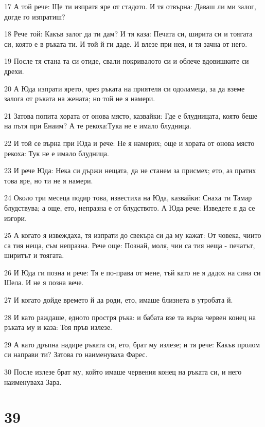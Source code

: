 \par 17 А той рече: Ще ти изпратя яре от стадото. И тя отвърна: Даваш ли ми залог, догде го изпратиш?
\par 18 Рече той: Какъв залог да ти дам? И тя каза: Печата си, ширита си и тоягата си, която е в ръката ти. И той й ги даде. И влезе при нея, и тя зачна от него.
\par 19 После тя стана та си отиде, свали покривалото си и облече вдовишките си дрехи.
\par 20 А Юда изпрати ярето, чрез ръката на приятеля си одоламеца, за да вземе залога от ръката на жената; но той не я намери.
\par 21 Затова попита хората от онова място, казвайки: Где е блудницата, която беше на пътя при Енаим? А те рекоха:Тука не е имало блудница.
\par 22 И той се върна при Юда и рече: Не я намерих; още и хората от онова място рекоха: Тук не е имало блудница.
\par 23 И рече Юда: Нека си държи нещата, да не станем за присмех; ето, аз пратих това яре, но ти не я намери.
\par 24 Около три месеца подир това, известиха на Юда, казвайки: Снаха ти Тамар блудствува; а още, ето, непразна е от блудството. А Юда рече: Изведете я да се изгори.
\par 25 А когато я извеждаха, тя изпрати до свекъра си да му кажат: От човека, чиито са тия неща, съм непразна. Рече още: Познай, моля, чии са тия неща - печатът, ширитът и тоягата.
\par 26 И Юда ги позна и рече: Тя е по-права от мене, тъй като не я дадох на сина си Шела. И не я позна вече.
\par 27 И когато дойде времето й да роди, ето, имаше близнета в утробата й.
\par 28 И като раждаше, едното простря ръка: и бабата взе та върза червен конец на ръката му и каза: Тоя пръв излезе.
\par 29 А като дръпна надире ръката си, ето, брат му излезе; и тя рече: Какъв пролом си направи ти? Затова го наименуваха Фарес.
\par 30 После излезе брат му, който имаше червения конец на ръката си, и него наименуваха Зара.

\chapter{39}

